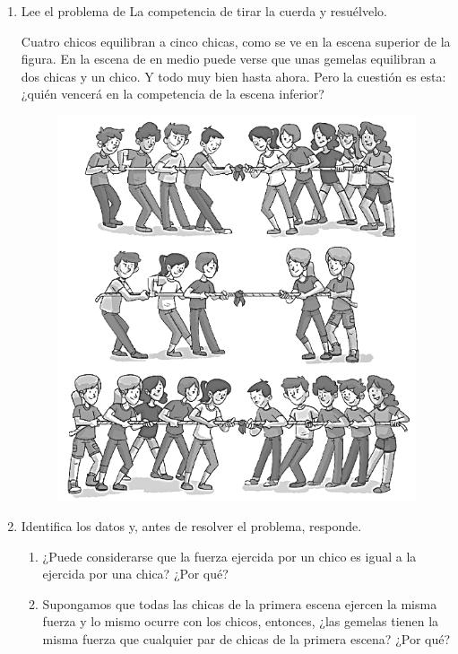 \documentclass[11pt]{book}
\begin{document}
\begin{boxK}
  \begin{enumerate}
    \item  Lee el problema de La competencia de tirar la cuerda y resuélvelo.

          \begin{boxF}
            Cuatro chicos equilibran a cinco chicas, como se ve en la escena superior de la
            figura. En la escena de en medio puede verse que unas gemelas equilibran a dos
            chicas y un chico. Y todo muy bien hasta ahora. Pero la cuestión es esta: ¿quién
            vencerá en la competencia de la escena inferior?
          \end{boxF}

          \begin{figure}[H]
            \centering
            \includegraphics[width=0.7\linewidth]{tira_cuerda.png}
            \label{fig:tira_cuerda}
          \end{figure}

    \item Identifica los datos y, antes de resolver el problema, responde.
          \begin{enumerate}
            \item ¿Puede considerarse que la fuerza ejercida por un chico es igual a la ejercida por una chica? ¿Por qué?
            \item Supongamos que todas las chicas de la primera escena ejercen la misma
                  fuerza y lo mismo ocurre con los chicos, entonces, ¿las gemelas tienen la
                  misma fuerza que cualquier par de chicas de la primera escena? ¿Por qué?
          \end{enumerate}


\end{enumerate}
\end{boxK}
\end{document}
